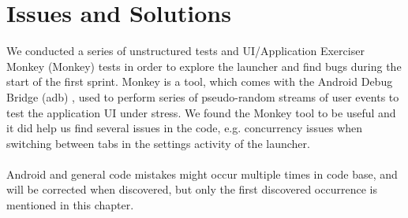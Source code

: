 
\chapter{Issues and Solutions}

We conducted a series of unstructured tests and UI/Application Exerciser Monkey (Monkey) \parencite{android_monkey} tests in order to explore the launcher and find bugs during the start of the first sprint. Monkey is a tool, which comes with the Android Debug Bridge (adb) \parencite{android_adb}, used to perform series of pseudo-random streams of user events to test the application UI under stress. We found the Monkey tool to be useful and it did help us find several issues in the code, e.g. concurrency issues when switching between tabs in the settings activity of the launcher.
\\\\
Android and general code mistakes might occur multiple times in code base, and will be corrected when discovered, but only the first discovered occurrence is mentioned in this chapter. 

















